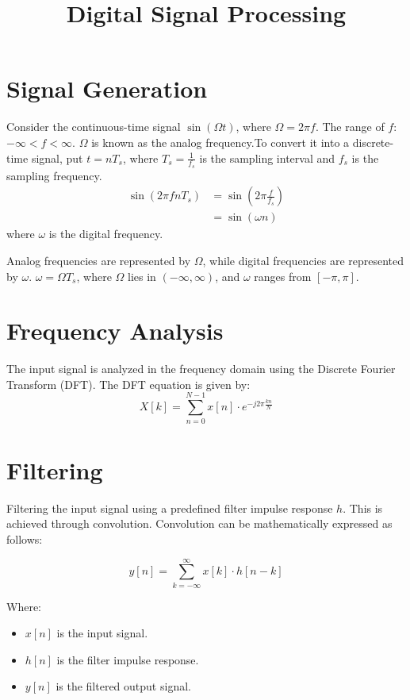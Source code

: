 \documentclass{article}
\title{Digital Signal Processing }
\author{}
\date{}
\begin{document}
\maketitle

\section{Signal Generation}

Consider the continuous-time signal \(\sin(\Omega t)\), where \(\Omega = 2\pi f\).
The range of \(f\): \(-\infty < f < \infty\).
\(\Omega\) is known as the analog frequency.To convert it into a discrete-time signal, put \(t = nT_s\), where \(T_s = \frac{1}{f_s}\) is the sampling interval and \(f_s\) is the sampling frequency.
\begin{align}
\sin(2\pi fnT_s) &= \sin(2\pi \frac{f}{f_s}) \\
&= \sin(\omega n)
\end{align}
where \(\omega\) is the digital frequency.

Analog frequencies are represented by \(\Omega\), while digital frequencies are represented by \(\omega\).
\(\omega = \Omega T_s\), where \(\Omega\) lies in \((- \infty, \infty)\), and \(\omega\) ranges from \([- \pi, \pi]\).

  \section{Frequency Analysis}
The input signal is analyzed in the frequency domain using the Discrete Fourier Transform (DFT). The DFT equation is given by:
\[
X[k] = \sum_{n=0}^{N-1} x[n] \cdot e^{-j2\pi \frac{kn}{N}}
\]
\section{Filtering}
Filtering the input signal using a predefined filter impulse response $h$. This is achieved through convolution. Convolution can be mathematically expressed as follows:

\[
y[n] = \sum_{k=-\infty}^{\infty} x[k] \cdot h[n - k]
\]

Where:
\begin{itemize}
    \item $x[n]$ is the input signal.
    \item $h[n]$ is the filter impulse response.
    \item $y[n]$ is the filtered output signal.
\end{itemize}
\end{document}

